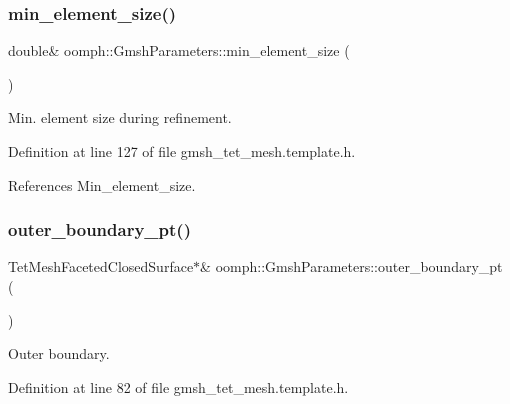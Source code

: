\mbox{\label{classoomph_1_1GmshParameters_a4afd4f1f72b1f45b3ca51b186737f264}} 
\subsubsection{\texorpdfstring{min\+\_\+element\+\_\+size()}{min\_element\_size()}}
{\footnotesize\ttfamily double\& oomph\+::\+Gmsh\+Parameters\+::min\+\_\+element\+\_\+size (\begin{DoxyParamCaption}{ }\end{DoxyParamCaption})\hspace{0.3cm}{\ttfamily [inline]}}



Min. element size during refinement. 



Definition at line 127 of file gmsh\+\_\+tet\+\_\+mesh.\+template.\+h.



References Min\+\_\+element\+\_\+size.

\mbox{\label{classoomph_1_1GmshParameters_abdd71edac9d5fd08a6a9c978d2673a2e}} 
\subsubsection{\texorpdfstring{outer\+\_\+boundary\+\_\+pt()}{outer\_boundary\_pt()}}
{\footnotesize\ttfamily Tet\+Mesh\+Faceted\+Closed\+Surface$\ast$\& oomph\+::\+Gmsh\+Parameters\+::outer\+\_\+boundary\+\_\+pt (\begin{DoxyParamCaption}{ }\end{DoxyParamCaption})\hspace{0.3cm}{\ttfamily [inline]}}



Outer boundary. 



Definition at line 82 of file gmsh\+\_\+tet\+\_\+mesh.\+template.\+h.



